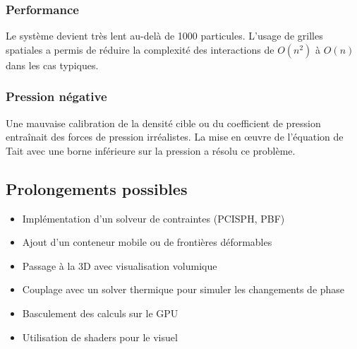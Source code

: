 \documentclass{article}
\begin{document}
\subsubsection{Performance}
Le système devient très lent au-delà de 1000 particules. L’usage de grilles spatiales a permis de réduire la complexité des interactions de \(O(n^2)\) à \(O(n)\) dans les cas typiques.
\subsubsection{Pression négative}
Une mauvaise calibration de la densité cible ou du coefficient de pression entraînait des forces de pression irréalistes. La mise en œuvre de l’équation de Tait avec une borne inférieure sur la pression a résolu ce problème.

\subsection{Prolongements possibles}
\begin{itemize}
\item Implémentation d’un solveur de contraintes (PCISPH, PBF)
\item Ajout d’un conteneur mobile ou de frontières déformables
\item Passage à la 3D avec visualisation volumique
\item Couplage avec un solver thermique pour simuler les changements de phase
\item Basculement des calculs sur le GPU
\item Utilisation de shaders pour le visuel
\end{itemize}
\end{document}
